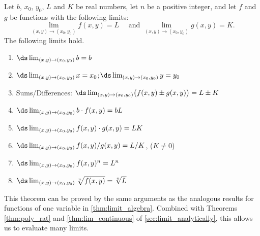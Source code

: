 \begin{theorem}\label{thm:multi_limit_algebra}%
Let $b$, $x_0$, $y_0$, $L$ and $K$ be real numbers,  let $n$ be a positive integer, and let $f$ and $g$ be functions with the following limits:
\[\lim_{(x,y)\to (x_0,y_0)}f(x,y) = L \quad \text{\ and\ } \lim_{(x,y)\to (x_0,y_0)} g(x,y) = K.\]
The following limits hold.
\begin{enumerate}
\settowidth{\widest}{Sums/Differences:}
\item {} $\ds\lim_{(x,y)\to (x_0,y_0)} b = b$
\item {} $\ds\lim_{(x,y)\to (x_0,y_0)} x = x_0$;\qquad $\ds\lim_{(x,y)\to (x_0,y_0)} y = y_0$
\item Sums/Differences: $\ds\lim_{(x,y)\to (x_0,y_0)}\bigl(f(x,y)\pm g(x,y)\bigr) = L\pm K$
\item {} $\ds\lim_{(x,y)\to (x_0,y_0)} b\cdot f(x,y) = bL$
\item {} $\ds\lim_{(x,y)\to (x_0,y_0)} f(x,y)\cdot g(x,y) = LK$
\item {} $\ds\lim_{(x,y)\to (x_0,y_0)} f(x,y)/g(x,y) = L/K$, ($K\neq 0$)
\item {} $\ds\lim_{(x,y)\to (x_0,y_0)} f(x,y)^n = L^n$
\item {} $\ds\lim_{(x,y)\to (x_0,y_0)} \sqrt[n]{f(x,y)} = \sqrt[n]{L}$\\
\makebox[\widest]{}
\end{enumerate}
\end{theorem}

This theorem can be proved by the same arguments as the analogous results for functions of one variable in \autoref{thm:limit_algebra}.  Combined with Theorems \ref{thm:poly_rat} and \ref{thm:lim_continuous} of \autoref{sec:limit_analytically}, this allows us to evaluate many limits.

